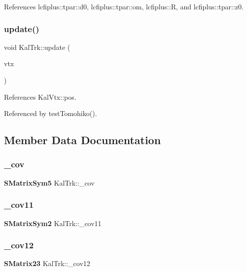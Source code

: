 References lcfiplus\+::tpar\+::d0, lcfiplus\+::tpar\+::om, lcfiplus\+::R, and lcfiplus\+::tpar\+::z0.

\mbox{\label{structKalTrk_a5ffea8c5eb9b66f8a33dea564e28dfb2}} 
\subsubsection{update()}
{\footnotesize\ttfamily void Kal\+Trk\+::update (\begin{DoxyParamCaption}\item[{\textbf{ Kal\+Vtx} \&}]{vtx }\end{DoxyParamCaption})\hspace{0.3cm}{\ttfamily [inline]}}



References Kal\+Vtx\+::pos.



Referenced by test\+Tomohiko().



\subsection{Member Data Documentation}
\mbox{\label{structKalTrk_ad85d8970209dff9b8d42f4346851f5fa}} 
\subsubsection{\+\_\+cov}
{\footnotesize\ttfamily \textbf{ S\+Matrix\+Sym5} Kal\+Trk\+::\+\_\+cov}

\mbox{\label{structKalTrk_a29177b2997e00b5ea452bb00e5a39319}} 
\subsubsection{\+\_\+cov11}
{\footnotesize\ttfamily \textbf{ S\+Matrix\+Sym2} Kal\+Trk\+::\+\_\+cov11}

\mbox{\label{structKalTrk_a939e9edc38e9a550eb4c643c51db9f35}} 
\subsubsection{\+\_\+cov12}
{\footnotesize\ttfamily \textbf{ S\+Matrix23} Kal\+Trk\+::\+\_\+cov12}

